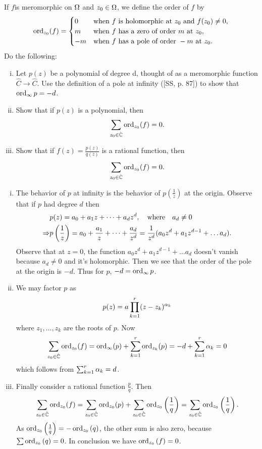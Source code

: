 \documentclass[12pt]{memoir}
\begin{document}
\begin{Ej}
    If $f $is meromorphic on $\Omega$ and $z_0\in\Omega$, we define the order of $f$ by
    $$
    \operatorname{ord}_{z_0}(f)=\begin{cases}
        0&\text{when }f\text{ is holomorphic at }z_0\text{ and }f(z_0)\neq 0,\\
        m&\text{when }f\text{ has a zero of order }m\text{ at }z_0,\\
        -m&\text{when }f\text{ has a pole of order }-m\text{ at }z_0.
    \end{cases}
    $$
    Do the following:
    \begin{enumerate}[i)]
        \itemsep=-0.4em
        \item Let $p(z)$ be a polynomial of degree d, thought of as a meromorphic function $\hat{C}\to\hat{C}$. Use the definition of a pole at infinity ([SS, p. 87]) to show that $\operatorname{ord}_{\infty}p=-d$.
        \item Show that if $p(z)$ is a polynomial, then 
        $$\sum_{z_0\in\hat{\mathbb{C}}}\operatorname{ord}_{z_0}(f)=0.$$
        \item Show that if $f(z)=\frac{p(z)}{q(z)}$ is a rational function, then 
        $$\sum_{z_0\in\hat{\mathbb{C}}}\operatorname{ord}_{z_0}(f)=0.$$
    \end{enumerate}
\end{Ej}

\begin{ptcbr}
    \begin{enumerate}[i)]
        \itemsep=-0.4em
        \item The behavior of $p$ at infinity is the behavior of $p\left(\frac1z\right)$ at the origin. Observe that if $p$ had degree $d$ then 
        \begin{align*}
        &p(z)=a_0+a_1z+\dots+a_dz^d,\quad\text{where}\quad a_d\neq 0\\
            \Rightarrow &p\left(\frac1z\right)=a_0+\frac{a_1}{z}+\dots+\frac{a_d}{z^d}=\frac{1}{z^d}(a_0z^d+a_1z^{d-1}+\dots a_d).
        \end{align*}
        Observe that at $z=0$, the function $a_0z^d+a_1z^{d-1}+\dots a_d$ doesn't vanish because $a_d\neq 0$ and it's holomorphic. Then we see that the order of the pole at the origin is $-d$. Thus for $p$, $-d=\operatorname{ord}_{\infty}p$.
        \item We may factor $p$ as 
         $$p(z)=a\prod_{k=1}^{r}(z-z_k)^{\alpha_k}$$
         where $z_1,\dots,z_k$ are the roots of $p$. Now
         $$\sum_{z_0\in\hat{\mathbb{C}}}\operatorname{ord}_{z_0}(f)=\operatorname{ord}_\infty(p)+\sum_{k=1}^{r}\operatorname{ord}_{z_k}(p)=-d+\sum_{k=1}^{r}\alpha_k=0$$
         which follows from $\sum_{k=1}^{r}\alpha_k=d$.
         \item Finally consider a rational function $\frac pq$. Then 
         $$\sum_{z_0\in\hat{\mathbb{C}}}\operatorname{ord}_{z_0}(f)=\sum_{z_0\in\hat{\mathbb{C}}}\operatorname{ord}_{z_0}(p)+\sum_{z_0\in\hat{\mathbb{C}}}\operatorname{ord}_{z_0}\left(\frac1q\right)=\sum_{z_0\in\hat{\mathbb{C}}}\operatorname{ord}_{z_0}\left(\frac1q\right).$$
         As $\operatorname{ord}_{z_0}\left(\frac1q\right)=-\operatorname{ord}_{z_0}\left(q\right)$, the other sum is also zero, because $\sum \operatorname{ord}_{z_0}\left(q\right)=0$. In conclusion we have $\operatorname{ord}_{z_0}\left(f\right)=0$.
    \end{enumerate}
\end{ptcbr}
\end{document}
